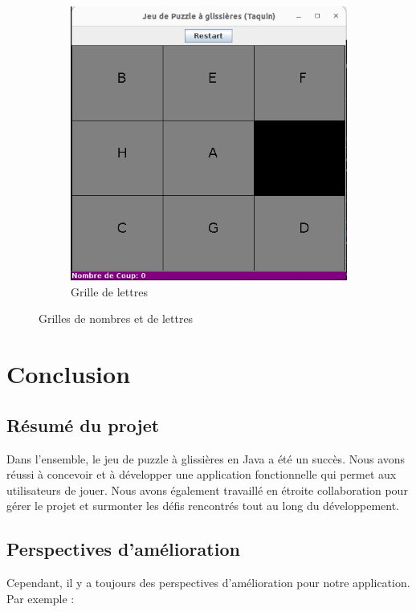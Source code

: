 \documentclass[a4paper,10pt]{article}
\begin{document}
\begin{figure}[H]
\begin{subfigure}{0.45\textwidth}
  \includegraphics[width=\linewidth]{captures/lettres.png}
  \caption{Grille de lettres}
\end{subfigure}
\caption{Grilles de nombres et de lettres}
\end{figure}
\section{Conclusion}

\subsection{Résumé du projet}
Dans l'ensemble, le jeu de puzzle à glissières en Java a été un succès. Nous avons réussi à concevoir et à développer une application fonctionnelle qui permet aux utilisateurs de jouer. Nous avons également travaillé en étroite collaboration pour gérer le projet et surmonter les défis rencontrés tout au long du développement.
\subsection{Perspectives d'amélioration}
Cependant, il y a toujours des perspectives d'amélioration pour notre application. Par exemple :
\end{document}
